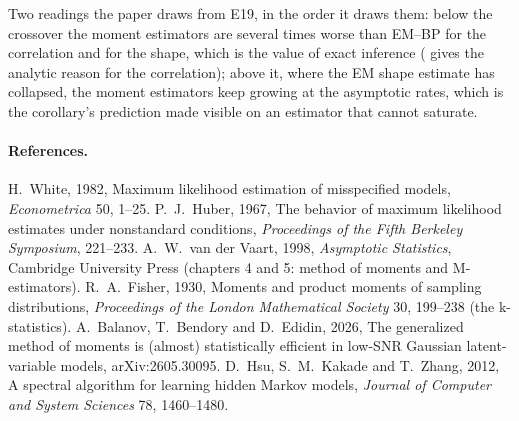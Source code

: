 Two readings the paper draws from E19, in the order it draws them: below the crossover
the moment estimators are several times worse than EM--BP for the correlation and for
the shape, which is the value of exact inference ( gives the analytic
reason for the correlation); above it, where the EM shape estimate has collapsed, the
moment estimators keep growing at the asymptotic rates, which is the corollary's
prediction made visible on an estimator that cannot saturate.


\paragraph{References.}
H.~White, 1982, Maximum likelihood estimation of misspecified models, \emph{Econometrica} 50, 1--25.
P.~J.~Huber, 1967, The behavior of maximum likelihood estimates under nonstandard conditions, \emph{Proceedings of the Fifth Berkeley Symposium}, 221--233.
A.~W.~van der Vaart, 1998, \emph{Asymptotic Statistics}, Cambridge University Press (chapters 4 and 5: method of moments and M-estimators).
R.~A.~Fisher, 1930, Moments and product moments of sampling distributions, \emph{Proceedings of the London Mathematical Society} 30, 199--238 (the k-statistics).
A.~Balanov, T.~Bendory and D.~Edidin, 2026, The generalized method of moments is (almost) statistically efficient in low-SNR Gaussian latent-variable models, arXiv:2605.30095.
D.~Hsu, S.~M.~Kakade and T.~Zhang, 2012, A spectral algorithm for learning hidden Markov models, \emph{Journal of Computer and System Sciences} 78, 1460--1480.
